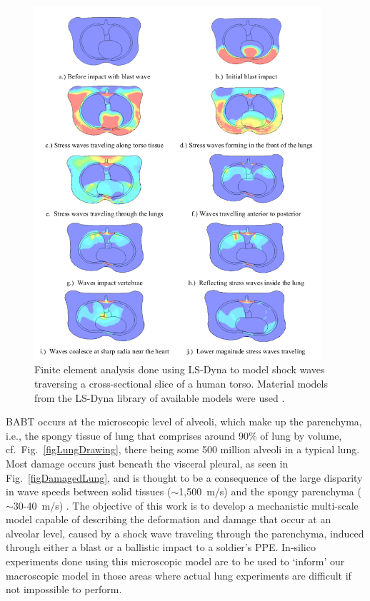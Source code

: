 \begin{figure}
    \centering
    \includegraphics[width=0.95\textwidth]{figures/shockWaveInTorso.png}
    \caption{Finite element analysis done using LS-Dyna to model shock waves traversing a cross-sectional slice of a human torso.  Material models from the LS-Dyna library of available models were used \cite{Josey10}.}
    \label{figShockWaveInLung}
\end{figure}

BABT occurs at the microscopic level of alveoli, which make up the parenchyma, i.e., the spongy tissue of lung that comprises around 90\% of lung by volume, cf.\ Fig.~\ref{figLungDrawing}, there being some 500 million alveoli in a typical lung.  Most damage occurs just beneath the visceral pleural, as seen in Fig.~\ref{figDamagedLung}, and is thought to be a consequence of the large disparity in wave speeds between solid tissues ($\sim$1,500~m/s) and the spongy parenchyma ($\sim$30-40~m/s) \cite{Stuhmiller08}.  The objective of this work is to develop a mechanistic multi-scale model capable of describing the deformation and damage that occur at an alveolar level, caused by a shock wave traveling through the parenchyma, induced through either a blast or a ballistic impact to a soldier's PPE.  In-silico experiments done using this microscopic model are to be used to `inform' our macroscopic model in those areas where actual lung experiments are difficult if not impossible to perform.

